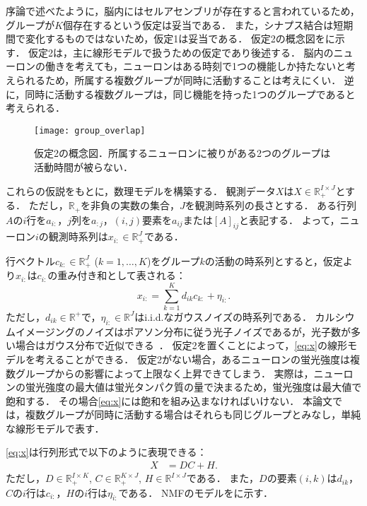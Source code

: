 序論で述べたように，脳内にはセルアセンブリが存在すると言われているため，グループが$K$個存在するという仮定は妥当である．
また，シナプス結合は短期間で変化するものではないため，仮定1は妥当である．
仮定2の概念図をに示す．
仮定2は，主に線形モデルで扱うための仮定であり後述する．
脳内のニューロンの働きを考えても，ニューロンはある時刻で1つの機能しか持たないと考えられるため，所属する複数グループが同時に活動することは考えにくい．
逆に，同時に活動する複数グループは，同じ機能を持った1つのグループであると考えられる．
\begin{figure}[htbp]
	\centering
	\texttt{[image: group\_overlap]}
	\caption{仮定2の概念図．所属するニューロンに被りがある2つのグループは活動時間が被らない．}
	\label{fig:assumption2}
\end{figure}

これらの仮説をもとに，数理モデルを構築する．
観測データ$X$は$X \in \mathbb{R}_+^{I \times J}$とする．
ただし，$\mathbb{R}_+$を非負の実数の集合，$J$を観測時系列の長さとする．
ある行列$A$の$i$行を$a_{i:}$，$j$列を$a_{:j}$，$(i,j)$要素を$a_{ij}$または$[A]_{ij}$と表記する．
よって，ニューロン$i$の観測時系列は$x_{i:} \in \mathbb{R}_+^{J}$である．

行ベクトル$c_{k:} \in \mathbb{R}^J_+$ ($k=1,\dots,K$)をグループ$k$の活動の時系列とすると，仮定より$x_{i:}$は$c_{i:}$の重み付き和として表される：
\begin{equation}
	x_{i:} = \sum_{k=1}^K d_{ik} c_{k:} + \eta_{i:}.
  \label{eq:x}
\end{equation}
ただし，$d_{ik} \in \mathbb{R}^+$で，$\eta_{i:} \in \mathbb{R}^J$はi.i.d.なガウスノイズの時系列である．
カルシウムイメージングのノイズはポアソン分布に従う光子ノイズであるが，光子数が多い場合はガウス分布で近似できる~\cite{Sjulson2007}． 仮定2を置くことによって，\eqref{eq:x}の線形モデルを考えることができる．
仮定2がない場合，あるニューロンの蛍光強度は複数グループからの影響によって上限なく上昇できてしまう．
実際は，ニューロンの蛍光強度の最大値は蛍光タンパク質の量で決まるため，蛍光強度は最大値で飽和する．
その場合\eqref{eq:x}には飽和を組み込まなければいけない．
本論文では，複数グループが同時に活動する場合はそれらも同じグループとみなし，単純な線形モデルで表す．

\eqref{eq:x}は行列形式で以下のように表現できる：
\begin{align}
  X &= DC + H. \label{eq:model_matrix}
\end{align}
ただし，$D \in \mathbb{R}_+^{I \times K}$, $C \in \mathbb{R}_+^{K \times J}$, $H \in \mathbb{R}^{I \times J}$である．
また，$D$の要素$(i,k)$は$d_{ik}$，$C$の$i$行は$c_{i:}$，$H$の$i$行は$\eta_{i:}$である．
NMFのモデルをに示す．

